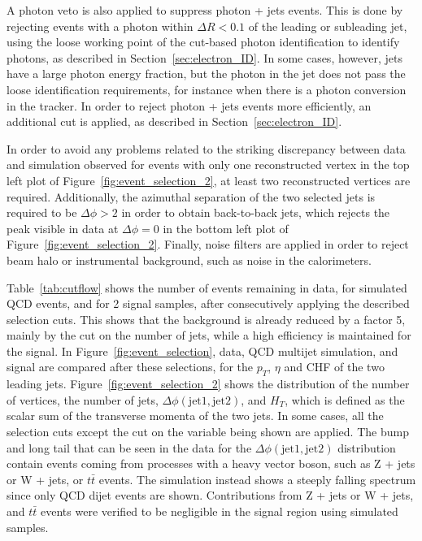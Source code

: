 A photon veto is also applied to suppress photon + jets events. This is done by rejecting events with a photon within $\Delta R < 0.1$ of the leading or subleading jet, using the loose working point of the cut-based photon identification to identify photons, as described in Section~\ref{sec:electron_ID}. In some cases, however, jets have a large photon energy fraction, but the photon in the jet does not pass the loose identification requirements, for instance when there is a photon conversion in the tracker. In order to reject photon + jets events more efficiently, an additional cut is applied, as described in Section~\ref{sec:electron_ID}.

In order to avoid any problems related to the striking discrepancy between data and simulation observed for events with only one reconstructed vertex in the top left plot of Figure~\ref{fig:event_selection_2}, at least two reconstructed vertices are required. Additionally, the azimuthal separation of the two selected jets is required to be $\Delta\phi > 2$ in order to obtain back-to-back jets, which rejects the peak visible in data at $\Delta\phi = 0$ in the bottom left plot of Figure~\ref{fig:event_selection_2}. Finally, noise filters are applied in order to reject beam halo or instrumental background, such as noise in the calorimeters.

Table~\ref{tab:cutflow} shows the number of events remaining in data, for simulated \ac{QCD} events, and for 2 signal samples, after consecutively applying the described selection cuts. This shows that the background is already reduced by a factor 5, mainly by the cut on the number of jets, while a high efficiency is maintained for the signal. In Figure~\ref{fig:event_selection}, data, \ac{QCD} multijet simulation, and signal are compared after these selections, for the $p_T$, $\eta$ and CHF of the two leading jets. Figure~\ref{fig:event_selection_2} shows the distribution of the number of vertices, the number of jets, $\Delta\phi(\mathrm{jet}1, \mathrm{jet}2)$, and $H_{T}$, which is defined as the scalar sum of the transverse momenta of the two jets. In some cases, all the selection cuts except the cut on the variable being shown are applied. The bump and long tail that can be seen in the data for the $\Delta\phi(\mathrm{jet}1, \mathrm{jet}2)$ distribution contain events coming from processes with a heavy vector boson, such as Z + jets or W + jets, or $t\bar{t}$ events. The simulation instead shows a steeply falling spectrum since only \ac{QCD} dijet events are shown. Contributions from Z + jets or W + jets, and $t\bar{t}$ events were verified to be negligible in the signal region using simulated samples.

